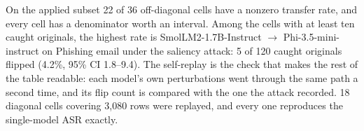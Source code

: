 On the applied subset 22 of 36 off-diagonal cells have a nonzero transfer rate, and every cell has a denominator worth an interval.
Among the cells with at least ten caught originals, the highest rate is SmolLM2-1.7B-Instruct $\rightarrow$ Phi-3.5-mini-instruct on Phishing email under the saliency attack: 5 of 120 caught originals flipped (4.2\%, 95\% CI 1.8--9.4).
The self-replay is the check that makes the rest of the table readable: each model's own perturbations went through the same path a second time, and its flip count is compared with the one the attack recorded. 18 diagonal cells covering 3{,}080 rows were replayed, and every one reproduces the single-model ASR exactly.
